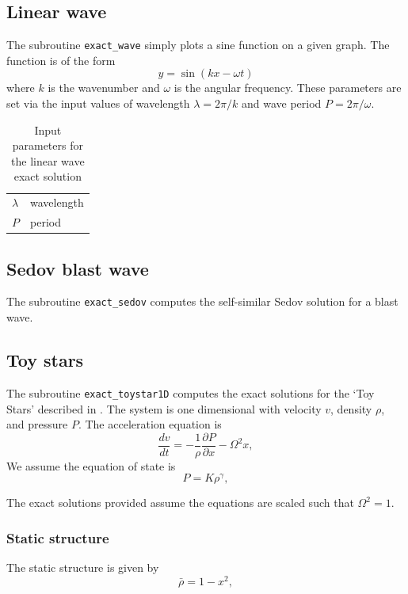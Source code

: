 \documentclass[a4paper,10pt]{article}
\begin{document}
\subsection{Linear wave}
 The subroutine \verb+exact_wave+ simply plots a sine function on a given graph.
 The function is of the form
\begin{equation}
y = \sin{(k x - \omega t)}
\end{equation}
where $k$ is the wavenumber and $\omega$ is the angular frequency. These
parameters are set via the input values of wavelength $\lambda = 2\pi/k$ and
wave period $P = 2\pi/\omega$.

\begin{table}
\centering
\begin{tabular}{|l|l|}
\hline
$\lambda$ & wavelength \\
$P$ & period \\
\hline
\end{tabular}
\caption{Input parameters for the linear wave exact solution}
\end{table}

\subsection{Sedov blast wave}
 The subroutine \verb+exact_sedov+ computes the self-similar Sedov solution for a blast wave.

\subsection{Toy stars}
 The subroutine \verb+exact_toystar1D+ computes the exact solutions for the `Toy
Stars' described in \citet{mp04}. The system is one dimensional with velocity $v$, density $\rho$, and pressure
$P$. The acceleration equation is 
\begin{equation}
\frac{dv}{dt} = - \frac{1}{\rho} \frac{\partial P}{\partial x}  - \Omega^2 x,
\end{equation}
 We assume the equation of state is 
\begin{equation}
P = K \rho^\gamma,
\end{equation} 

 The exact solutions provided assume the equations are scaled such that
$\Omega^2 = 1$.
 
\subsubsection{ Static structure}
The static structure is given by
\begin{equation}
\bar \rho = 1- x^2,
\end{equation}
\end{document}
